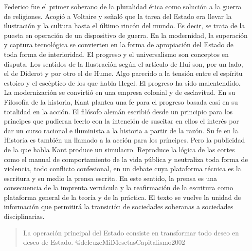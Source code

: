 \documentclass[
]{article}
\begin{document}
Federico fue el primer soberano de la pluralidad ética como solución a
la guerra de religiones. Acogió a Voltaire y señaló que la tarea del
Estado era llevar la ilustración y la cultura hasta el último rincón del
mundo. Es decir, se trata de la puesta en operación de un dispositivo de
guerra. En la modernidad, la superación y captura tecnológica se
convierten en la forma de apropiación del Estado de toda forma de
interioridad. El progreso y el universalismo son conceptos en disputa.
Los sentidos de la Ilustración según el artículo de Hui son, por un
lado, el de Diderot y por otro el de Hume. Algo parecido a la tensión
entre el espíritu estoico y el escéptico de los que habla Hegel. El
progreso ha sido malentendido. La modernización se convirtió en una
empresa colonial y de esclavitud. En su Filosofía de la historia, Kant
plantea una fe para el progreso basada casi en su totalidad en la
acción. El filósofo alemán escribió desde un principio para los
príncipes que pudieran leerlo con la intención de suscitar en ellos el
interés por dar un curso racional e iluminista a la historia a partir de
la razón. Su fe en la Historia es también un llamado a la acción para
los príncipes. Pero la publicidad de la que habla Kant produce un
simulacro. Reproduce la lógica de las cortes como el manual de
comportamiento de la vida pública y neutraliza toda forma de violencia,
todo conflicto confesional, en un debate cuya plataforma técnica es la
escritura y su medio la prensa escrita. En este sentido, la prensa es
una consecuencia de la imprenta vernácula y la reafirmación de la
escritura como plataforma general de la teoría y de la práctica. El
texto se vuelve la unidad de información que permitirá la transición de
sociedades soberanas a sociedades disciplinarias.

\begin{quote}
La operación principal del Estado consiste en transformar todo deseo en
deseo de Estado. @deleuzeMilMesetasCapitalismo2002
\end{quote}
\end{document}
